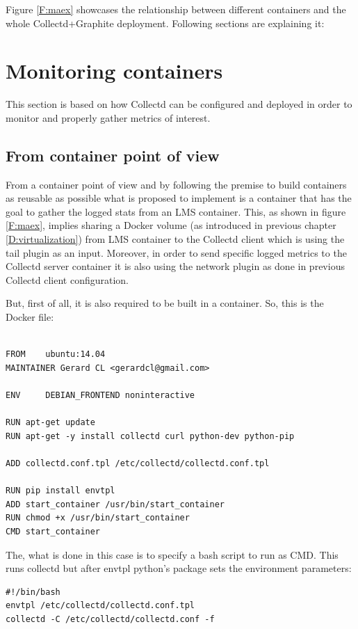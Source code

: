 Figure \ref{F:maex} showcases the relationship between different containers and the whole Collectd+Graphite deployment. Following sections are explaining it:

\section{Monitoring containers}

This section is based on how Collectd can be configured and deployed in order to monitor and properly gather metrics of interest.

\subsection{From container point of view}

From a container point of view and by following the premise to build containers as reusable as possible what is proposed to implement is a container that has the goal to gather the logged stats from an LMS container. This, as shown in figure \ref{F:maex}, implies sharing a Docker volume (as introduced in previous chapter \ref{D:virtualization}) from LMS container to the Collectd client which is using the tail plugin as an input. Moreover, in order to send specific logged metrics to the Collectd server container it is also using the network plugin as done in previous Collectd client configuration.

But, first of all, it is also required to be built in a container. So, this is the Docker file:

\begin{verbatim}

FROM    ubuntu:14.04
MAINTAINER Gerard CL <gerardcl@gmail.com>

ENV     DEBIAN_FRONTEND noninteractive

RUN apt-get update
RUN apt-get -y install collectd curl python-dev python-pip

ADD collectd.conf.tpl /etc/collectd/collectd.conf.tpl

RUN pip install envtpl
ADD start_container /usr/bin/start_container
RUN chmod +x /usr/bin/start_container
CMD start_container

\end{verbatim}

The, what is done in this case is to specify a bash script to run as CMD. This runs collectd but after envtpl python's package sets the environment parameters:
\begin{verbatim}
#!/bin/bash
envtpl /etc/collectd/collectd.conf.tpl
collectd -C /etc/collectd/collectd.conf -f
\end{verbatim}

